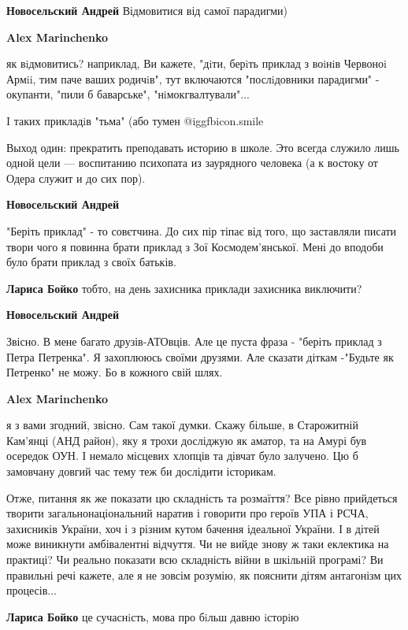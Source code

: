 \begin{itemize}
\begin{itemize}
\textbf{Новосельский Андрей} Відмовитися від самої парадигми)

\textbf{Alex Marinchenko} 

як вiдмовитись? наприклад, Ви кажете, "дiти, берiть приклад з воiнiв Червоноi
Армii, тим паче ваших родичiв", тут включаются "послiдовники парадигми" -
окупанти, "пили б баварське", "нiмокгвалтували"...

I таких прикладiв "тьма" (або тумен  @igg{fbicon.smile} 


Выход один: прекратить преподавать историю в школе. Это всегда служило лишь
одной цели — воспитанию психопата из заурядного человека (а к востоку от Одера
служит и до сих пор).

\textbf{Новосельский Андрей} 

"Беріть приклад" - то совєтчина. До сих пір тіпає від того, що заставляли
писати твори чого я повинна брати приклад з Зої Космодем'янської. Мені до
вподоби було брати приклад з своїх батьків.

\textbf{Лариса Бойко} тобто, на день захисника приклади захисника виключити?

\textbf{Новосельский Андрей} 

Звісно. В мене багато друзів-АТОвців. Але це пуста фраза - "беріть приклад з
Петра Петренка". Я захоплююсь своїми друзями. Але сказати діткам -"Будьте як
Петренко" не можу. Бо в кожного свій шлях.

\textbf{Alex Marinchenko} 

я з вами згодний, звісно. Сам такої думки. Скажу більше, в Старожитній Кам'янці
(АНД район), яку я трохи досліджую як аматор, та на Амурі був осередок ОУН. І
немало місцевих хлопців та дівчат було залучено. Цю б замовчану довгий час тему
теж би дослідити історикам.

Отже, питання як же показати цю складність та розмаїття? Все рівно прийдеться
творити загальнонаціональний наратив і говорити про героїв УПА і РСЧА,
захисників України, хоч і з різним кутом бачення ідеальної України. І в дітей
може виникнути амбівалентні відчуття. Чи не вийде знову ж таки еклектика на
практиці? Чи реально показати всю складність війни в шкільній програмі? Ви
правильні речі кажете, але я не зовсім розумію, як пояснити дітям антагонізм
цих процесів...

\textbf{Лариса Бойко} це сучаснiсть, мова про бiльш давню iсторiю


\end{itemize}
\end{itemize}
